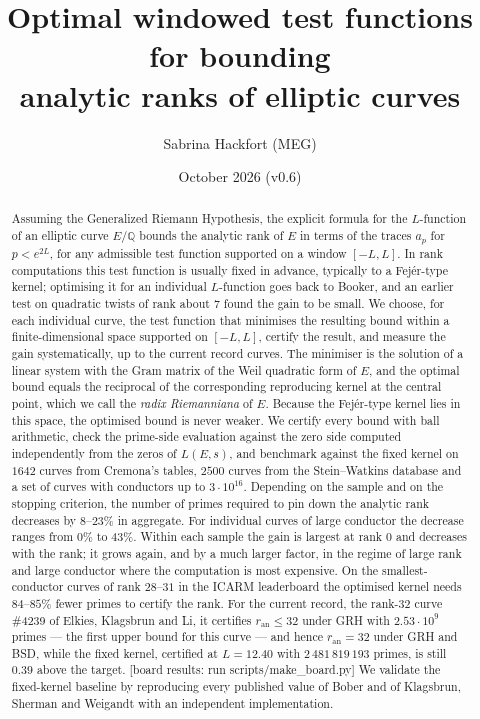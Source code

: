 \documentclass[11pt]{amsart}
\title[Optimal windowed test functions for analytic rank bounds]{Optimal windowed test functions for bounding\\ analytic ranks of elliptic curves}
\author{Sabrina Hackfort (MEG)}
\date{October 2026 \quad (v0.6)}
\theoremstyle{remark}
\theoremstyle{definition}
\newcommand{\Q}{\mathbb{Q}}
\newcommand{\ran}{r_{\mathrm{an}}}
\newcommand{\BoardAbstract}{[board results: run scripts/make\_board.py]}%
\begin{document}
\begin{abstract}
Assuming the Generalized Riemann Hypothesis, the explicit formula for the $L$-function of an elliptic curve $E/\Q$ bounds the analytic rank of $E$ in terms of the traces $a_p$ for $p < e^{2L}$, for any admissible test function supported on a window $[-L,L]$. In rank computations this test function is usually fixed in advance, typically to a Fej\'er-type kernel; optimising it for an individual $L$-function goes back to Booker, and an earlier test on quadratic twists of rank about $7$ found the gain to be small. We choose, for each individual curve, the test function that minimises the resulting bound within a finite-dimensional space supported on $[-L,L]$, certify the result, and measure the gain systematically, up to the current record curves. The minimiser is the solution of a linear system with the Gram matrix of the Weil quadratic form of $E$, and the optimal bound equals the reciprocal of the corresponding reproducing kernel at the central point, which we call the \emph{radix Riemanniana} of $E$. Because the Fej\'er-type kernel lies in this space, the optimised bound is never weaker. We certify every bound with ball arithmetic, check the prime-side evaluation against the zero side computed independently from the zeros of $L(E,s)$, and benchmark against the fixed kernel on $1642$ curves from Cremona's tables, $2500$ curves from the Stein--Watkins database and a set of curves with conductors up to $3\cdot 10^{16}$. Depending on the sample and on the stopping criterion, the number of primes required to pin down the analytic rank decreases by $8$--$23\%$ in aggregate. For individual curves of large conductor the decrease ranges from $0\%$ to $43\%$. Within each sample the gain is largest at rank $0$ and decreases with the rank; it grows again, and by a much larger factor, in the regime of large rank and large conductor where the computation is most expensive. On the smallest-conductor curves of rank $28$--$31$ in the ICARM leaderboard the optimised kernel needs $84$--$85\%$ fewer primes to certify the rank. For the current record, the rank-$32$ curve \#4239 of Elkies, Klagsbrun and Li, it certifies $\ran\le32$ under GRH with $2.53\cdot10^{9}$ primes --- the first upper bound for this curve --- and hence $\ran=32$ under GRH and BSD, while the fixed kernel, certified at $L=12.40$ with $2\,481\,819\,193$ primes, is still $0.39$ above the target. \BoardAbstract{} We validate the fixed-kernel baseline by reproducing every published value of Bober and of Klagsbrun, Sherman and Weigandt with an independent implementation.
\end{abstract}
\end{document}
